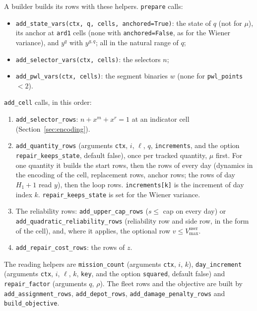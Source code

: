 A builder builds its rows with these helpers. \texttt{prepare} calls:
\begin{itemize}[nosep,leftmargin=1.5em]
  \item \texttt{add\_state\_vars(ctx, q, cells, anchored=True)}: the state of $q$ (not for $\mu$), its anchor at \texttt{ard1} cells (none with \texttt{anchored=False}, as for the Wiener variance), and $y^q$ with $y^{g,q}$; all in the natural range of $q$;
  \item \texttt{add\_selector\_vars(ctx, cells)}: the selectors $n$;
  \item \texttt{add\_pwl\_vars(ctx, cells)}: the segment binaries $w$ (none for \texttt{pwl\_points} $< 2$).
\end{itemize}
\texttt{add\_cell} calls, in this order:
\begin{enumerate}[nosep,label=\arabic*.]
  \item \texttt{add\_selector\_rows}: $n + x^m + x^r = 1$ at an indicator cell (Section~\ref{sec:encoding}).
  \item \texttt{add\_quantity\_rows} (arguments \texttt{ctx}, $i$, $\ell$, $q$, \texttt{increments}, and the option \texttt{repair\_keeps\_state}, default false), once per tracked quantity, $\mu$ first. For one quantity it builds the start rows, then the rows of every day (dynamics in the encoding of the cell, replacement rows, anchor rows; the rows of day $H_1 + 1$ read $y$), then the loop rows. \texttt{increments[k]} is the increment of day index $k$. \texttt{repair\_keeps\_state} is set for the Wiener variance.
  \item The reliability rows: \texttt{add\_upper\_cap\_rows} ($s \le$ cap on every day) or \texttt{add\_quadratic\_reliability\_rows} (reliability row and side row, in the form of the cell), and, where it applies, the optional row $v \le V^{\mathrm{user}}_{\max}$.
  \item \texttt{add\_repair\_cost\_rows}: the rows of $z$.
\end{enumerate}
The reading helpers are \texttt{mission\_count} (arguments \texttt{ctx}, $i$, $k$), \texttt{day\_increment} (arguments \texttt{ctx}, $i$, $\ell$, $k$, \texttt{key}, and the option \texttt{squared}, default false) and \texttt{repair\_factor} (arguments $q$, $\rho$). The fleet rows and the objective are built by \texttt{add\_assignment\_rows}, \texttt{add\_depot\_rows}, \texttt{add\_damage\_penalty\_rows} and \texttt{build\_objective}.

